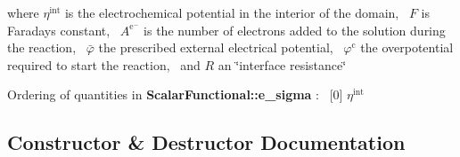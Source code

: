 where $\eta^\mathrm{int}$ is the electrochemical potential in the interior of the domain,~\newline
 $F$ is Faraday\textquotesingle{}s constant,~\newline
 $A^{\mathrm{e^-}}$ is the number of electrons added to the solution during the reaction,~\newline
 $\bar{\varphi}$ the prescribed external electrical potential,~\newline
 $\varphi^\mathrm{c}$ the overpotential required to start the reaction,~\newline
 and $R$ an \char`\"{}interface resistance\char`\"{}

Ordering of quantities in {\bf Scalar\+Functional\+::e\+\_\+sigma} \+:~\newline
\mbox{[}0\mbox{]} $\eta^\mathrm{int}$ 

\subsection{Constructor \& Destructor Documentation}
